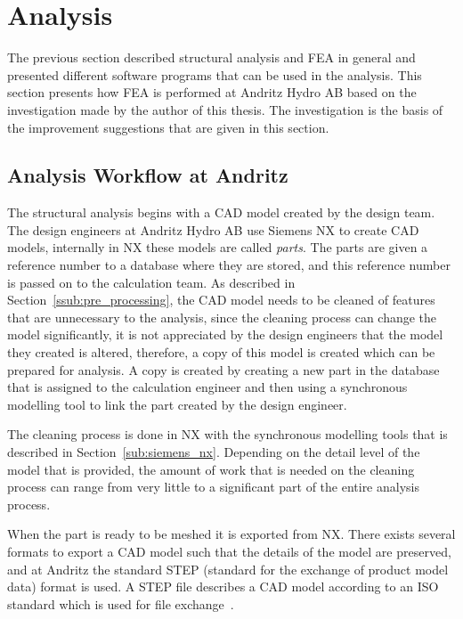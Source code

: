 
\section{Analysis} %
\label{sec:analysis}
The previous section described structural analysis and FEA in general and presented different software programs that can be used in the analysis. This section presents how FEA is performed at Andritz Hydro AB based on the investigation made by the author of this thesis. The investigation is the basis of the improvement suggestions that are given in this section.

\subsection{Analysis Workflow at Andritz} %
\label{sub:analysis_workflow_at_andritz}
The structural analysis begins with a CAD model created by the design team. The design engineers at Andritz Hydro AB use Siemens NX to create CAD models, internally in NX these models are called \textit{parts}. The parts are given a reference number to a database where they are stored, and this reference number is passed on to the calculation team. As described in Section~\ref{ssub:pre_processing}, the CAD model needs to be cleaned of features that are unnecessary to the analysis, since the cleaning process can change the model significantly, it is not appreciated by the design engineers that the model they created is altered, therefore, a copy of this model is created which can be prepared for analysis. A copy is created by creating a new part in the database that is assigned to the calculation engineer and then using a synchronous modelling tool to link the part created by the design engineer.

The cleaning process is done in NX with the synchronous modelling tools that is described in Section~\ref{sub:siemens_nx}. Depending on the detail level of the model that is provided, the amount of work that is needed on the cleaning process can range from very little to a significant part of the entire analysis process. 

When the part is ready to be meshed it is exported from NX. There exists several formats to export a CAD model such that the details of the model are preserved, and at Andritz the standard STEP (standard for the exchange of product model data) format is used. A STEP file describes a CAD model according to an ISO standard which is used for file exchange~\cite{stepiso}.

